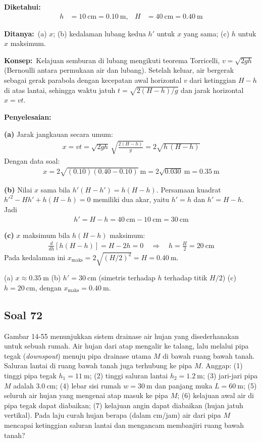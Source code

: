 \documentclass[12pt,a4paper]{article}
\newcommand{\diketahui}{\par\medskip\noindent\textbf{Diketahui:}}
\newcommand{\ditanya}{\par\medskip\noindent\textbf{Ditanya:}}
\newcommand{\konsep}{\par\medskip\noindent\textbf{Konsep:}}
\newcommand{\penyelesaian}{\par\medskip\noindent\textbf{Penyelesaian:}\par\nopagebreak}
\newcommand{\soal}[1]{%
  \setcounter{equation}{0}%
  \phantomsection
  \addcontentsline{toc}{subsection}{Soal #1}%
  \subsection*{Soal #1}}
\begin{document}
\diketahui
\begin{align*}
h &= \SI{10}{\centi\meter} = \SI{0,10}{\meter}, &
H &= \SI{40}{\centi\meter} = \SI{0,40}{\meter}
\end{align*}
 
\ditanya\ (a) $x$; (b) kedalaman lubang kedua $h'$ untuk $x$ yang sama; (c) $h$ untuk $x$ maksimum.
 
\konsep\ Kelajuan semburan di lubang mengikuti teorema Torricelli, $v = \sqrt{2gh}$
(Bernoulli antara permukaan air dan lubang). Setelah keluar, air bergerak sebagai gerak
parabola dengan kecepatan awal horizontal $v$ dari ketinggian $H-h$ di atas lantai, sehingga
waktu jatuh $t = \sqrt{2(H-h)/g}$ dan jarak horizontal $x = vt$.
 
\penyelesaian
 
\textbf{(a)} Jarak jangkauan secara umum:
\begin{align*}
x = vt = \sqrt{2gh}\,\sqrt{\frac{2(H-h)}{g}} = 2\sqrt{h\,(H-h)}
\end{align*}
Dengan data soal:
\begin{align*}
x = 2\sqrt{(\num{0,10})(\num{0,40}-\num{0,10})}\ \si{\meter}
  = 2\sqrt{\num{0,030}}\ \si{\meter} = \SI{0,35}{\meter}
\end{align*}
 
\textbf{(b)} Nilai $x$ sama bila $h'(H-h') = h(H-h)$. Persamaan kuadrat
$h'^2 - Hh' + h(H-h) = 0$ memiliki dua akar, yaitu $h' = h$ dan $h' = H - h$. Jadi
\begin{align*}
h' = H - h = \SI{40}{\centi\meter} - \SI{10}{\centi\meter} = \SI{30}{\centi\meter}
\end{align*}
 
\textbf{(c)} $x$ maksimum bila $h(H-h)$ maksimum:
\begin{align*}
\frac{d}{dh}\left[h(H-h)\right] = H - 2h = 0 \quad\Rightarrow\quad h = \frac{H}{2} = \SI{20}{\centi\meter}
\end{align*}
Pada kedalaman ini $x_{\text{maks}} = 2\sqrt{(H/2)^2} = H = \SI{0,40}{\meter}$.
 
\begin{jawaban}
(a) $x \approx \SI{0,35}{\meter}$ \quad (b) $h' = \SI{30}{\centi\meter}$ (simetris terhadap $h$ terhadap titik $H/2$)
\quad (c) $h = \SI{20}{\centi\meter}$, dengan $x_{\text{maks}} = \SI{0,40}{\meter}$.
\end{jawaban}

\soal{72}
Gambar 14-55 menunjukkan sistem drainase air hujan yang disederhanakan untuk sebuah rumah.
Air hujan dari atap mengalir ke talang, lalu melalui pipa tegak (\textit{downspout}) menuju
pipa drainase utama $M$ di bawah ruang bawah tanah. Saluran lantai di ruang bawah tanah juga
terhubung ke pipa $M$. Anggap: (1) tinggi pipa tegak $h_1 = \SI{11}{\meter}$;
(2) tinggi saluran lantai $h_2 = \SI{1,2}{\meter}$; (3) jari-jari pipa $M$ adalah $\SI{3,0}{\centi\meter}$;
(4) lebar sisi rumah $w = \SI{30}{\meter}$ dan panjang muka $L = \SI{60}{\meter}$;
(5) seluruh air hujan yang mengenai atap masuk ke pipa $M$; (6) kelajuan awal air di pipa tegak
dapat diabaikan; (7) kelajuan angin dapat diabaikan (hujan jatuh vertikal).
Pada laju curah hujan berapa (dalam cm/jam) air dari pipa $M$ mencapai ketinggian saluran lantai
dan mengancam membanjiri ruang bawah tanah?
 
\end{document}
